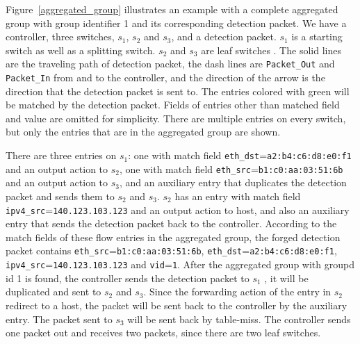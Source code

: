 Figure~\ref{aggregated_group} illustrates an example with a complete aggregated group with group identifier 1 and its corresponding detection packet. We have a controller, three switches, $s_1$, $s_2$ and $s_3$, and a detection packet. $s_1$ is a starting switch as well as a splitting switch. $s_2$ and $s_3$ are leaf switches \sout{}. The solid lines are the traveling path of detection packet, the dash lines are \texttt{Packet\_Out} and \texttt{Packet\_In} from and to the controller, and the direction of the arrow is the direction that the detection packet is sent to. The entries colored with green will be matched by the detection packet. Fields of entries other than matched field and value are omitted for simplicity. There are multiple entries on every switch, but only the entries that are in the aggregated group are shown\sout{}.

There are three entries on $s_1$: one with match field \texttt{eth\_dst}=\texttt{a2:b4:c6:d8:e0:f1} and an output action to $s_2$, one with match field \texttt{eth\_src}=\texttt{b1:c0:aa:03:51:6b} and an output action to $s_3$, and an auxiliary entry that duplicates the detection packet and sends them to $s_2$ and $s_3$. $s_2$ has an entry with match field \texttt{ipv4\_src}=\texttt{140.123.103.123} and an output action to host, and also an auxiliary entry that sends the detection packet back to the controller. According to the match fields of these flow entries in the aggregated group, the forged detection packet contains \texttt{eth\_src}=\texttt{b1:c0:aa:03:51:6b}, \texttt{eth\_dst}=\texttt{a2:b4:c6:d8:e0:f1}, \texttt{ipv4\_src}=\texttt{140.123.103.123} and \texttt{vid}=\texttt{1}. After the aggregated group with groupd id 1 is found\sout{}, the controller sends the detection packet to $s_1$ \sout{}, it will be duplicated and sent to $s_2$ and $s_3$. Since the forwarding action of the entry in $s_2$ redirect \sout{} to a host, the packet will be sent back to the controller by the auxiliary entry. The packet sent to $s_3$ will be sent back by table-miss. The controller sends one packet out and receives two packets, since there are two leaf switches.

